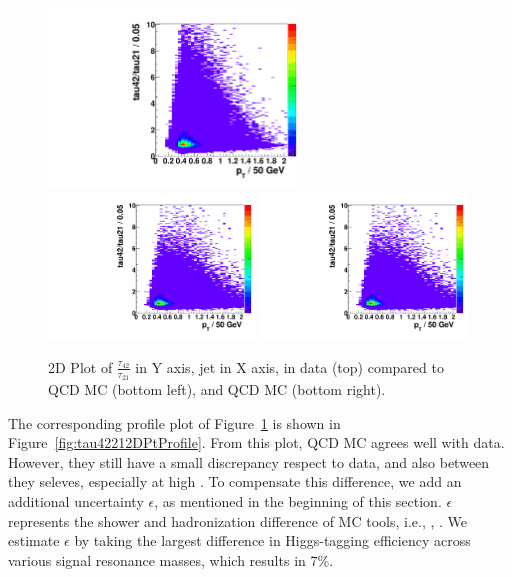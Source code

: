 \begin{figure}[ht!b]
\begin{center}
\includegraphics[width=0.6\textwidth,angle=0]{figs/SFExtra/tau4221Pt2DData.pdf}
\includegraphics[width=0.49\textwidth,angle=0]{figs/SFExtra/tau4221Pt2DPythia.pdf}
\includegraphics[width=0.49\textwidth,angle=0]{figs/SFExtra/tau4221Pt2DPythia.pdf}
\end{center}
\caption{ 2D Plot of
$\frac{\tau_{42}}{\tau_{21}}$ in Y axis, 
jet \pt in X axis, in data (top) compared to \PYTHIA QCD MC (bottom left), and
\HERWIG QCD MC (bottom right).
}
\label{fig:tau42212DPt}
\end{figure}

The corresponding profile plot of Figure~\ref{fig:tau42212DPt} is shown in 
Figure~\ref{fig:tau42212DPtProfile}. From this plot, QCD MC agrees well with 
data. However, they still have a small discrepancy respect to data, and also between
they seleves, especially at high \pt. To compensate this difference, we add an 
additional uncertainty $\epsilon$, as mentioned in the beginning of this section. 
$\epsilon$ represents the shower and hadronization difference of MC tools, i.e., 
\PYTHIA, \HERWIG.  We estimate $\epsilon$ by taking the largest difference in 
Higgs-tagging efficiency across various signal resonance masses, which results in 
7\%. 


